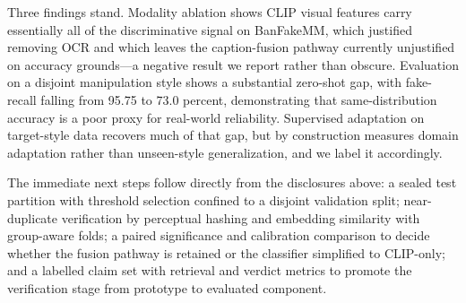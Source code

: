 \documentclass[conference,a4paper]{IEEEtran}
\begin{document}
Three findings stand. Modality ablation shows CLIP visual features carry
essentially all of the discriminative signal on BanFakeMM, which justified
removing OCR and which leaves the caption-fusion pathway currently unjustified
on accuracy grounds---a negative result we report rather than obscure.
Evaluation on a disjoint manipulation style shows a substantial zero-shot gap,
with fake-recall falling from 95.75 to 73.0 percent, demonstrating that
same-distribution accuracy is a poor proxy for real-world reliability.
Supervised adaptation on target-style data recovers much of that gap, but by
construction measures domain adaptation rather than unseen-style
generalization, and we label it accordingly.

The immediate next steps follow directly from the disclosures above: a sealed
test partition with threshold selection confined to a disjoint validation
split; near-duplicate verification by perceptual hashing and embedding
similarity with group-aware folds; a paired significance and calibration
comparison to decide whether the fusion pathway is retained or the classifier
simplified to CLIP-only; and a labelled claim set with retrieval and verdict
metrics to promote the verification stage from prototype to evaluated
component.
\end{document}
